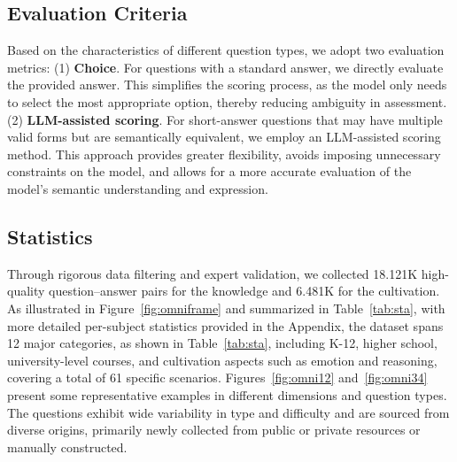 \begin{table}[tbp]
    \centering
    \caption{Expert validation results for the OmniEduBench dataset.}
    \vspace{0.2mm}
    \label{tab:ev}
    \vspace{-6mm}
\end{table}

\subsection{Evaluation Criteria}
\label{subsec:ec}

Based on the characteristics of different question types, we adopt two evaluation metrics: (1) \textbf{Choice}. For questions with a standard answer, we directly evaluate the provided answer. This simplifies the scoring process, as the model only needs to select the most appropriate option, thereby reducing ambiguity in assessment. (2) \textbf{LLM-assisted scoring}. For short-answer questions that may have multiple valid forms but are semantically equivalent, we employ an LLM-assisted scoring method. This approach provides greater flexibility, avoids imposing unnecessary constraints on the model, and allows for a more accurate evaluation of the model’s semantic understanding and expression.

\subsection{Statistics}

Through rigorous data filtering and expert validation, we collected 18.121K high-quality question–answer pairs for the knowledge and 6.481K for the cultivation. As illustrated in Figure~\ref{fig:omniframe} and summarized in Table~\ref{tab:sta}, with more detailed per-subject statistics provided in the Appendix, the dataset spans 12 major categories, as shown in Table~\ref{tab:sta}, including K-12, higher school, university-level courses, and cultivation aspects such as emotion and reasoning, covering a total of 61 specific scenarios. Figures~\ref{fig:omni12} and~\ref{fig:omni34} present some representative examples in different dimensions and question types. The questions exhibit wide variability in type and difficulty and are sourced from diverse origins, primarily newly collected from public or private resources or manually constructed. 


